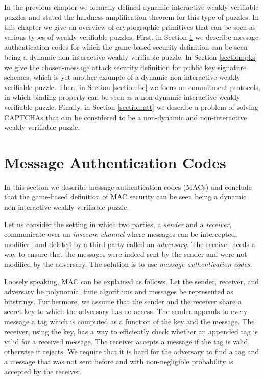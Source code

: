 %
In the previous chapter we formally defined dynamic interactive weakly verifiable puzzles
and stated the hardness amplification theorem for this type of puzzles.
In this chapter we give an overview of cryptographic primitives that can be seen as various types of weakly verifiable puzzles.
First, in Section \ref{section:mac} we describe message authentication codes for which the game-based security definition can be seen being a dynamic
non-interactive weakly verifiable puzzle.
In Section \ref{section:pks} we give the chosen-message attack security definition
for public key signature schemes, which is yet another example of a dynamic non-interactive weakly verifiable puzzle.
Then, in Section \ref{section:bc} we focus on commitment protocols, in which binding property can be seen as a non-dynamic interactive  weakly verifiable puzzle.
Finally, in Section \ref{section:att} we describe a problem of solving CAPTCHAs that can be considered to be a non-dynamic and non-interactive weakly verifiable puzzle.

\section{Message Authentication Codes}
\label{section:mac}
In this section we describe message authentication codes (MACs) and conclude that the game-based definition of MAC
security can be seen being a dynamic non-interactive weakly verifiable puzzle.

Let us consider the setting in which two parties, a \textit{sender} and a \textit{receiver}, communicate over an \textit{insecure channel} where
messages can be intercepted, modified, and deleted by a third party called an \textit{adversary}.
The receiver needs a way to ensure that the messages were indeed sent by the sender and were not modified by the adversary.
The solution is to use \textit{message authentication codes}.

Loosely speaking, MAC can be explained as follows.
Let the sender, receiver, and adversary be polynomial time algorithms and messages be represented as bitstrings.
Furthermore, we assume that the sender and the receiver share a secret key to which the adversary has no access.
The sender appends to every message a tag which is computed as a function of the key and the message.
The receiver, using the key, has a way to efficiently check whether an appended tag is valid for a received message.
The receiver accepts a message if the tag is valid, otherwise it rejects.
We require that it is hard for the adversary to find a tag and a message that was not sent before and
with non-negligible probability is accepted by the receiver.

